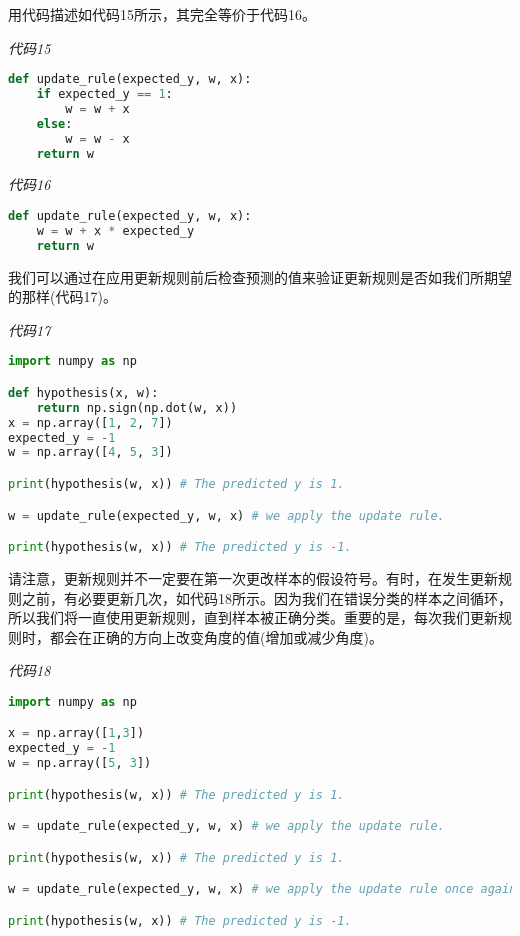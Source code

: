 用代码描述如代码15所示，其完全等价于代码16。

\emph{代码15}

\begin{lstlisting}[language=python]
def update_rule(expected_y, w, x): 
    if expected_y == 1:
        w = w + x 
    else: 
        w = w - x 
    return w

\end{lstlisting}

\emph{代码16}

\begin{lstlisting}[language=python]
def update_rule(expected_y, w, x):
    w = w + x * expected_y 
    return w

\end{lstlisting}

我们可以通过在应用更新规则前后检查预测的值来验证更新规则是否如我们所期望的那样(代码17)。


\emph{代码17}

\begin{lstlisting}[language=python]
import numpy as np 

def hypothesis(x, w): 
    return np.sign(np.dot(w, x)) 
x = np.array([1, 2, 7]) 
expected_y = -1 
w = np.array([4, 5, 3]) 

print(hypothesis(w, x)) # The predicted y is 1. 

w = update_rule(expected_y, w, x) # we apply the update rule. 

print(hypothesis(w, x)) # The predicted y is -1.

\end{lstlisting}

请注意，更新规则并不一定要在第一次更改样本的假设符号。有时，在发生更新规则之前，有必要更新几次，如代码18所示。因为我们在错误分类的样本之间循环，所以我们将一直使用更新规则，直到样本被正确分类。重要的是，每次我们更新规则时，都会在正确的方向上改变角度的值(增加或减少角度)。

\emph{代码18}

\begin{lstlisting}[language=python]
import numpy as np 

x = np.array([1,3]) 
expected_y = -1 
w = np.array([5, 3]) 

print(hypothesis(w, x)) # The predicted y is 1. 

w = update_rule(expected_y, w, x) # we apply the update rule. 

print(hypothesis(w, x)) # The predicted y is 1. 

w = update_rule(expected_y, w, x) # we apply the update rule once again.

print(hypothesis(w, x)) # The predicted y is -1.

\end{lstlisting}

